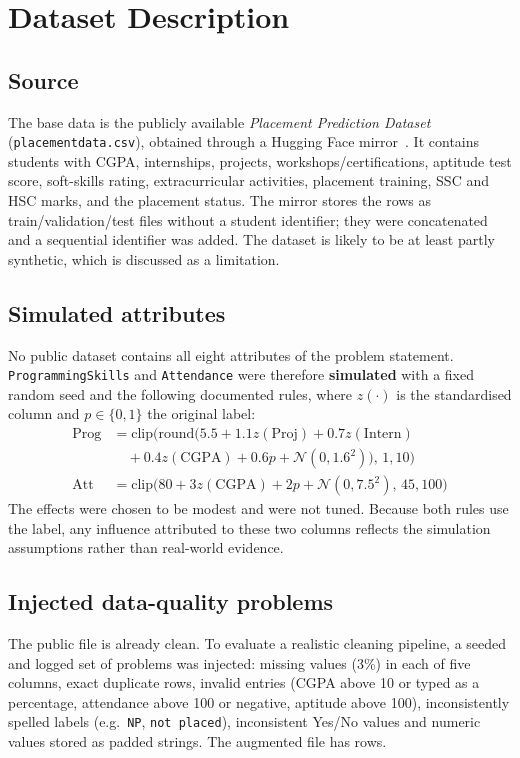 \documentclass[conference]{IEEEtran}
\begin{document}
\section{Dataset Description}\label{sec:data}
\subsection{Source}
The base data is the publicly available \emph{Placement Prediction Dataset} (\texttt{placementdata.csv}),
obtained through a Hugging Face mirror~\cite{dataset_hf}. It contains \RawRows{} students with CGPA,
internships, projects, workshops/certifications, aptitude test score, soft-skills rating, extracurricular
activities, placement training, SSC and HSC marks, and the placement status. The mirror stores the rows as
train/validation/test files without a student identifier; they were concatenated and a sequential identifier
was added. The dataset is likely to be at least partly synthetic, which is discussed as a limitation.

\subsection{Simulated attributes}
No public dataset contains all eight attributes of the problem statement. \texttt{ProgrammingSkills} and
\texttt{Attendance} were therefore \textbf{simulated} with a fixed random seed and the following documented
rules, where $z(\cdot)$ is the standardised column and $p\in\{0,1\}$ the original label:
\begin{align*}
\text{Prog} &= \mathrm{clip}\big(\mathrm{round}(5.5 + 1.1z(\text{Proj}) + 0.7z(\text{Intern})\\
            &\quad + 0.4z(\text{CGPA}) + 0.6p + \mathcal{N}(0,1.6^2)),\,1,10\big)\\
\text{Att}  &= \mathrm{clip}\big(80 + 3z(\text{CGPA}) + 2p + \mathcal{N}(0,7.5^2),\,45,100\big)
\end{align*}
The effects were chosen to be modest and were not tuned. Because both rules use the label, any influence
attributed to these two columns reflects the simulation assumptions rather than real-world evidence.

\subsection{Injected data-quality problems}
The public file is already clean. To evaluate a realistic cleaning pipeline, a seeded and logged set of problems
was injected: \MissingInjectedPerCol{} missing values (3\%) in each of five columns, \DupAdded{} exact
duplicate rows, \InvalidInjected{} invalid entries (CGPA above 10 or typed as a percentage, attendance above 100
or negative, aptitude above 100), \LabelsInjected{} inconsistently spelled labels (e.g.\ \texttt{NP},
\texttt{not placed}), inconsistent Yes/No values and numeric values stored as padded strings. The augmented file
has \AugRows{} rows.
\end{document}
